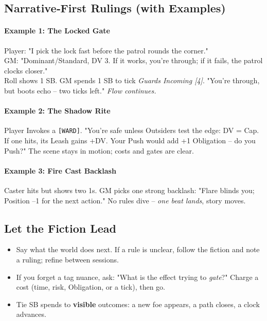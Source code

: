 \subsection{Narrative‑First Rulings (with Examples)}
\paragraph{Example 1: The Locked Gate}
Player: "I pick the lock fast before the patrol rounds the corner."\\
GM: "Dominant/Standard, DV 3. If it works, you're through; if it fails, the patrol clocks closer."\\
Roll shows 1 SB. GM spends 1 SB to tick \emph{Guards Incoming [4]}. "You're through, but boots echo -- two ticks left." \emph{Flow continues.}

\paragraph{Example 2: The Shadow Rite}
Player Invokes a \texttt{[WARD]}. "You're safe unless Outsiders test the edge: DV = Cap. If one hits, its Leash gains +DV. Your Push would add +1 Obligation -- do you Push?" The scene stays in motion; costs and gates are clear.

\paragraph{Example 3: Fire Cast Backlash}
Caster hits but shows two 1s. GM picks one strong backlash: "Flare blinds you; Position –1 for the next action." No rules dive -- \emph{one beat lands}, story moves.

\subsection{Let the Fiction Lead}
\begin{itemize}
  \item Say what the world does next. If a rule is unclear, follow the fiction and note a ruling; refine between sessions.
  \item If you forget a tag nuance, ask: "What is the effect trying to \emph{gate}?" Charge a cost (time, risk, Obligation, or a tick), then go.
  \item Tie SB spends to \textbf{visible} outcomes: a new foe appears, a path closes, a clock advances.
\end{itemize}

